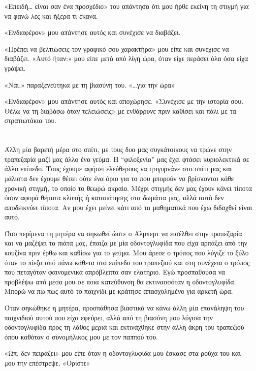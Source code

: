 \documentclass[12pt,twoside, openany]{book}
\begin{document}
«Επειδή… είναι σαν ένα προσχέδιο» του απάντησα ότι μου ήρθε εκείνη τη στιγμή για να φανώ λες και ήξερα τι έκανα.

«Ενδιαφέρον» μου απάντησε αυτός και συνέχισε να διαβάζει.

«Πρέπει να βελτιώσεις τον γραφικό σου χαρακτήρα» μου είπε και συνέχισε να διαβάζει. «Αυτό ήταν;» μου είπε μετά από λίγη ώρα, όταν είχε περάσει όλα όσα είχα γράψει.

«Ναι;» παραξενεύτηκα με τη βιασύνη του. «…για την ώρα»

«Ενδιαφέρον» μου απάντησε αυτός και αποχώρησε. «Συνέχισε με την ιστορία σου. Θέλω να τη διαβάσω όταν τελειώσεις» με ενθάρρυνε πριν καθίσει και πάλι με τα στρατιωτάκια του.


\chapter{}

Άλλη μία βαρετή μέρα στο σπίτι, με τους δυο μας συγκάτοικους να τρώνε στην τραπεζαρία μαζί μας άλλο ένα γεύμα. Η “φιλοξενία” μας έχει φτάσει κυριολεκτικά σε άλλο επίπεδο. Τους έχουμε αφήσει ελεύθερους να τριγυρνάνε στο σπίτι μας και μάλιστα δεν έχουμε θέσει ούτε ένα όριο για το που μπορούν να βρίσκονται κάθε χρονική στιγμή, το οποίο το θεωρώ ακραίο. Μέχρι στιγμής δεν μας έχουν κάνει τίποτα όσον αφορά θέματα κλοπής ή καταπάτησης στα δωμάτια μας, αλλά αυτό δεν αποδεικνύει τίποτα. Αν μου έχει μείνει κάτι από τα μαθηματικά που έχω διδαχθεί είναι αυτό.

Όσο περίμενα τη μητέρα να σηκωθεί ώστε ο Άλμπερτ να εισέλθει στην τραπεζαρία και να μαζέψει τα πιάτα μας, έπαιζα με μία οδοντογλυφίδα που είχα αρπάξει από την κουζίνα πριν έρθω και καθίσω για το γεύμα. Μου άρεσε ο τρόπος που λύγιζε το ξύλο όταν το πίεζα από πάνω κάθετα στο επίπεδο του τραπεζιού και στη συνέχεια ο τρόπος που πεταγόταν φαινομενικά απρόβλεπτα σαν ελατήριο. Εγώ προσπαθούσα να προβλέψω από μέσα μου σε ποια κατεύθυνση θα εκτινασσόταν η οδοντογλυφίδα. Μπορώ να πω πως αυτό το παιχνίδι με κράτησε απασχολημένο για αρκετή ώρα.

Όταν σηκώθηκε η μητέρα, προσπάθησα βιαστικά να κάνω άλλη μία επανάληψη του παιχνιδιού αυτού που είχα εφεύρει, αλλά από τη βιασύνη μου λύγισα την οδοντογλυφίδα προς τη λάθος μεριά και εκτινάχθηκε στην άλλη άκρη του τραπεζιού όπου καθόταν ο συνομήλικος μου με τον παππού του.

«Ωπ, δεν πειράζει» μου είπε όταν η οδοντογλυφίδα μου έσκασε στα ρούχα του και μου την επέστρεψε. «Ορίστε»
\end{document}
